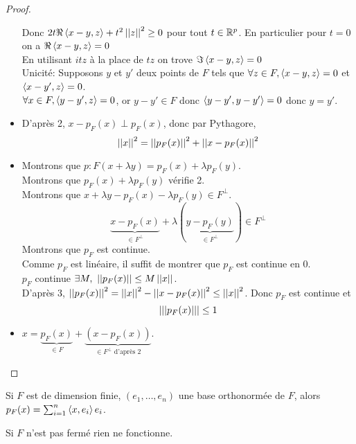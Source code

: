 \begin{proof}
\begin{itemize}
		      Donc $2t\Re \left\langle x - y, z \right\rangle + t^2 \left|\left|z\right|\right|^2 \geq 0$ pour tout $t \in \mathbb{R}^p$.
		      En particulier pour $t = 0$ on a $\Re \left\langle x - y, z \right\rangle = 0$ \\
		      En utilisant $itz$ à la place de $tz$ on trove $\Im \left\langle x - y, z \right\rangle = 0$\\

		      Unicité: Supposons $y$ et $y'$ deux points de $F$ tels que $\forall z \in F, \left\langle x - y, z \right\rangle = 0$ et $\left\langle x - y', z \right\rangle = 0$.\\
		      $\forall x \in F, \left\langle y - y', z \right\rangle = 0$, or $y - y' \in F$ donc $\left\langle y - y', y - y' \right\rangle = 0$ donc $y = y'$.
		\item D'après 2, $x - p_F(x) \perp p_F(x)$, donc par Pythagore,
		      $$ \left|\left|x\right|\right|^2 = \left|\left|p_F(x)\right|\right|^2 + \left|\left|x - p_F(x)\right|\right|^2 $$
		\item Montrons que $p:F( x + \lambda y) = p_F(x) + \lambda p_F(y)$.\\
		      Montrons que $p_F(x) + \lambda p_F(y)$ vérifie 2.\\
		      Montrons que $x + \lambda y - p_F(x) - \lambda p_F(y) \in F^\perp$.\\
		      $$ \underbrace{x - p_F(x)}_{\in F^\perp} + \lambda\left( \underbrace{y - p_F(y)}_{\in F^\perp} \right) \in F^\perp $$
		      Montrons que $p_F$ est continue.\\
		      Comme $p_F$ est linéaire, il suffit de montrer que $p_F$ est continue en 0.\\
		      $p_F$ continue \ssi $\exists M, \ \left|\left|p_F(x)\right|\right| \leq M \left|\left|x\right|\right|$.\\

		      D'après 3, $\left|\left|p_F(x)\right|\right|^2 = \left|\left|x\right|\right|^2 - \left|\left|x - p_F(x)\right|\right|^2 \leq \left|\left|x\right|\right|^2$. Donc $p_F$ est continue et
		      $$ \left| \left|\left|p_F(x)\right|\right| \right| \leq 1 $$ %

		\item $x = \underbrace{p_F(x)}_{\in F} + \underbrace{(x - p_F(x))}_{\in F^\perp \text { d'après 2}}$.
	\end{itemize}
\end{proof}

\begin{remarque}
	Si $F$ est de dimension finie, $(e_1, \ldots, e_n)$ une base orthonormée de $F$, alors $p_F(x) = \sum_{i=1}^n \left\langle x, e_i \right\rangle e_i$.
\end{remarque}

\begin{remarque}
	Si $F$ n'est pas fermé rien ne fonctionne.
\end{remarque}

